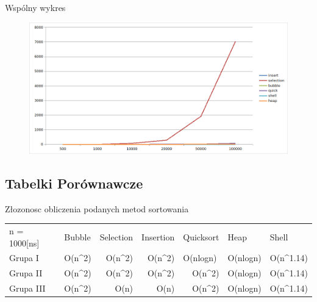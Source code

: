 \documentclass{article}
\begin{document}
Wspólny wykres
\begin{figure}[H]
    \centering
    \includegraphics[width=\textwidth]{"../assets/3_3.png"}
    \label{fig:3_3}
\end{figure}

\subsection*{Tabelki Porównawcze}

Złozonosc obliczenia podanych metod sortowania \newline


\begin{table}[H]
    \begin{tabular}{lrlllll}
    n = 1000{[}ns{]} & \multicolumn{1}{l}{Bubble} & Selection                                   & Insertion                                   & Quicksort                                   & Heap                             & Shell                      \\
    Grupa I          & O(n\textasciicircum{}2)    & \multicolumn{1}{r}{O(n\textasciicircum{}2)} & \multicolumn{1}{r}{O(n\textasciicircum{}2)} & O(nlogn)                                    & O(nlogn) & O(n\textasciicircum{}1.14) \\
    Grupa II         & O(n\textasciicircum{}2)    & \multicolumn{1}{r}{O(n\textasciicircum{}2)} & \multicolumn{1}{r}{O(n\textasciicircum{}2)} & \multicolumn{1}{r}{O(n\textasciicircum{}2)} & O(nlogn) & O(n\textasciicircum{}1.14) \\
    Grupa III        & O(n\textasciicircum{}2)    & \multicolumn{1}{r}{O(n)}                    & \multicolumn{1}{r}{O(n)}                                       & \multicolumn{1}{r}{O(n\textasciicircum{}2)} & O(nlogn) & O(n\textasciicircum{}1.14)
    \end{tabular}
    \end{table}
\end{document}
